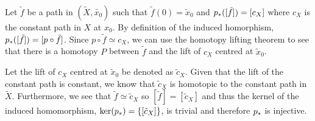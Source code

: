 \documentclass{article}
\begin{document}
\begin{flushleft}
    Let $\tilde{f}$ be a path in $(\tilde{X}, \tilde{x_0})$ such that $\tilde{f}(0) = \tilde{x}_0$ and $p_{\ast}([\tilde{f}]) = [c_X]$ where $c_X$ is the constant path in $X$ at $x_0$. By definition of the induced homorphism, $p_{\ast}([\tilde{f}]) = [p \circ \tilde{f}]$. Since $p \circ \tilde{f} \simeq c_X$, we can use the homotopy lifting theorem to see that there is a homotopy $P$ between $\tilde{f}$ and the lift of $c_X$ centred at $\tilde{x}_0$. \newline

    Let the lift of $c_X$ centred at $\tilde{x}_0$ be denoted as $\tilde{c}_X$. Given that the lift of the constant path is constant, we know that $\tilde{c}_X$ is homotopic to the constant path in $\tilde{X}$. Furthermore, we see that $\tilde{f} \simeq \tilde{c}_X$ so $[\tilde{f}] = [\tilde{c}_X]$ and thus the kernel of the induced homomorphism, $\text{ker}(p_{\ast}) = \{[\tilde{c}_X]\}$, is trivial and therefore $p_{\ast}$ is injective.
\end{flushleft}
\end{document}
